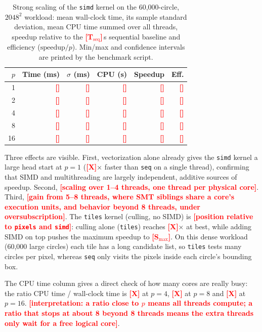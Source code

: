 \documentclass[10pt,twocolumn,letterpaper]{article}
\newcommand{\tbd}[1]{\textcolor{red}{\textbf{[#1]}}}
\begin{document}
\begin{table}[h]
\centering
\small
\setlength{\tabcolsep}{4pt}
\begin{tabular}{@{}rrrrrr@{}}
\toprule
\textbf{$p$} & \textbf{Time (ms)} & \textbf{$\sigma$ (ms)} & \textbf{CPU (s)} & \textbf{Speedup} & \textbf{Eff.} \\
\midrule
1  & \tbd{} & \tbd{} & \tbd{} & \tbd{} & \tbd{} \\
2  & \tbd{} & \tbd{} & \tbd{} & \tbd{} & \tbd{} \\
4  & \tbd{} & \tbd{} & \tbd{} & \tbd{} & \tbd{} \\
8  & \tbd{} & \tbd{} & \tbd{} & \tbd{} & \tbd{} \\
16 & \tbd{} & \tbd{} & \tbd{} & \tbd{} & \tbd{} \\
\bottomrule
\end{tabular}
\caption{Strong scaling of the \texttt{simd} kernel on the 60{,}000-circle,
$2048^2$ workload: mean wall-clock time, its sample standard deviation,
mean CPU time summed over all threads, speedup relative to the
\tbd{T$_{\text{seq}}$}\,s sequential baseline and efficiency
($\text{speedup}/p$). Min/max and confidence intervals are printed by the
benchmark script.}
\label{tab:scaling}
\end{table}

Three effects are visible. First, vectorization alone already gives the
\texttt{simd} kernel a large head start at $p{=}1$ (\tbd{X}$\times$ faster than
\texttt{seq} on a single thread), confirming that SIMD and multithreading are
largely independent, additive sources of speedup. Second, \tbd{scaling over
1--4 threads, one thread per physical core}. Third, \tbd{gain from 5--8
threads, where SMT siblings share a core's execution units, and behavior
beyond 8 threads, under oversubscription}. The \texttt{tiles}
kernel (culling, no SIMD) is \tbd{position relative to \texttt{pixels} and
\texttt{simd}}: culling alone (\texttt{tiles}) reaches \tbd{X}$\times$ at best,
while adding SIMD on top pushes the maximum speedup to \tbd{S$_{\max}$}. On this
dense workload (60{,}000 large circles) each tile has a long candidate list,
so \texttt{tiles} tests many circles per pixel, whereas \texttt{seq} only
visits the pixels inside each circle's bounding box.

The CPU time column gives a direct check of how many cores are really
busy: the ratio CPU time / wall-clock time is \tbd{X} at $p{=}4$,
\tbd{X} at $p{=}8$ and \tbd{X} at $p{=}16$. %
\tbd{interpretation: a ratio close to $p$ means all threads compute; a ratio
that stops at about 8 beyond 8 threads means the extra threads only wait for
a free logical core}.
\end{document}
